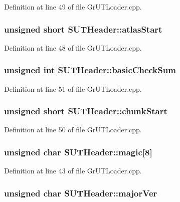 Definition at line 49 of file GrUTLoader.cpp.\hypertarget{struct_s_u_t_header_9e7bd76e03d33e6c3abf8bb8dfff7114}{
\subsubsection[{atlasStart}]{\setlength{\rightskip}{0pt plus 5cm}unsigned short {\bf SUTHeader::atlasStart}}}
\label{struct_s_u_t_header_9e7bd76e03d33e6c3abf8bb8dfff7114}




Definition at line 48 of file GrUTLoader.cpp.\hypertarget{struct_s_u_t_header_a2005bd7672275f54997ef96dfc69b58}{
\subsubsection[{basicCheckSum}]{\setlength{\rightskip}{0pt plus 5cm}unsigned int {\bf SUTHeader::basicCheckSum}}}
\label{struct_s_u_t_header_a2005bd7672275f54997ef96dfc69b58}




Definition at line 51 of file GrUTLoader.cpp.\hypertarget{struct_s_u_t_header_e3658a7f87cd2bab631d25a256ca5d69}{
\subsubsection[{chunkStart}]{\setlength{\rightskip}{0pt plus 5cm}unsigned short {\bf SUTHeader::chunkStart}}}
\label{struct_s_u_t_header_e3658a7f87cd2bab631d25a256ca5d69}




Definition at line 50 of file GrUTLoader.cpp.\hypertarget{struct_s_u_t_header_4b17f37b5ec2b84cd7e556e1db1526fd}{
\subsubsection[{magic}]{\setlength{\rightskip}{0pt plus 5cm}unsigned char {\bf SUTHeader::magic}\mbox{[}8\mbox{]}}}
\label{struct_s_u_t_header_4b17f37b5ec2b84cd7e556e1db1526fd}




Definition at line 43 of file GrUTLoader.cpp.\hypertarget{struct_s_u_t_header_d52c5e749973c73c642fb84681920831}{
\subsubsection[{majorVer}]{\setlength{\rightskip}{0pt plus 5cm}unsigned char {\bf SUTHeader::majorVer}}}
\label{struct_s_u_t_header_d52c5e749973c73c642fb84681920831}




